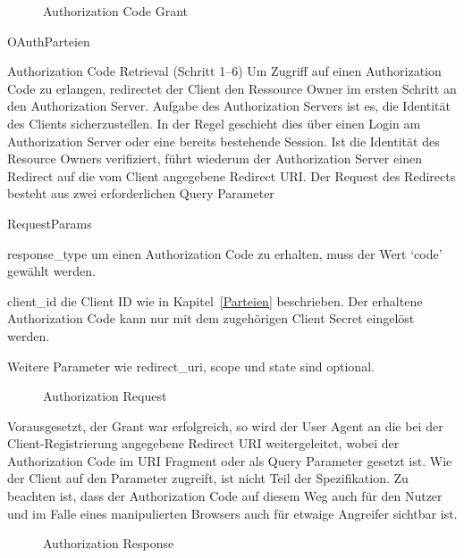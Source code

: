 \begin{figure}[h]
    \scalebox{.6}{
        
    }
    \caption{Authorization Code Grant}\label{fig: Authorization Code Grant}
\end{figure}

\begin{labeling}{OAuthParteien}
    \item [Authorization Code Retrieval (Schritt 1--6)] Um Zugriff auf einen Authorization Code
    zu erlangen, redirectet der Client den Ressource Owner im ersten Schritt
    an den Authorization Server. Aufgabe des Authorization Servers ist es,
    die Identität des Clients sicherzustellen. In der Regel geschieht dies über
    einen Login am Authorization Server oder eine bereits bestehende Session.
    Ist die Identität des Resource Owners verifiziert, führt wiederum der
    Authorization Server einen Redirect auf die vom Client angegebene Redirect
    URI. Der Request des Redirects besteht aus zwei erforderlichen Query
    Parameter
    \begin{labeling}{RequestParams}
        \item [response\_type] um einen Authorization Code zu erhalten,
        muss der Wert `code' gewählt werden.
        \item [client\_id] die Client ID wie in Kapitel~\ref{Parteien}
        beschrieben. Der erhaltene Authorization Code kann nur mit dem
        zugehörigen Client Secret eingelöst werden.
    \end{labeling}
    Weitere Parameter wie redirect\_uri, scope und state sind optional.
    \begin{figure}[h]
        
        \caption{Authorization Request}\label{ls: Authorization Request}
    \end{figure}
    Vorausgesetzt, der Grant war erfolgreich, so wird der User Agent an die bei
    der Client-Registrierung angegebene Redirect URI weitergeleitet, wobei der
    Authorization Code im URI Fragment oder als Query Parameter gesetzt ist. Wie
    der Client auf den Parameter zugreift, ist nicht Teil der Spezifikation. Zu
    beachten ist, dass der Authorization Code auf diesem Weg auch für den Nutzer
    und im Falle eines manipulierten Browsers auch für etwaige Angreifer
    sichtbar ist.
    \begin{figure}[h]
        
        \caption{Authorization Response}\label{ls: Authorization Response}
    \end{figure}


\end{labeling}
